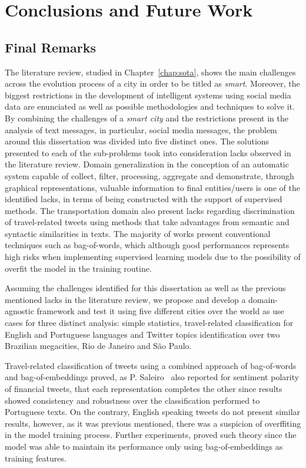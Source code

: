 \chapter{Conclusions and Future Work} \label{chap:conclusions}

\minitoc \mtcskip \noindent

\section{Final Remarks}
The literature review, studied in Chapter~\ref{chap:sota}, shows the main challenges across the evolution process of a city in order to be titled as \textit{smart}. Moreover, the biggest restrictions in the development of intelligent systems using social media data are enunciated as well as possible methodologies and techniques to solve it. By combining the challenges of a \textit{smart city} and the restrictions present in the analysis of text messages, in particular, social media messages, the problem around this dissertation was divided into five distinct ones. The solutions presented to each of the sub-problems took into consideration lacks observed in the literature review. Domain generalization in the conception of an automatic system capable of collect, filter, processing, aggregate and demonstrate, through graphical representations, valuable information to final entities/users is one of the identified lacks, in terms of being constructed with the support of supervised methods. The transportation domain also present lacks regarding discrimination of travel-related tweets using methods that take advantages from semantic and syntactic similarities in texts. The majority of works present conventional techniques such as bag-of-words, which although good performances represents high risks when implementing supervised learning models due to the possibility of overfit the model in the training routine.

Assuming the challenges identified for this dissertation as well as the previous mentioned lacks in the literature review, we propose and develop a domain-agnostic framework and test it using five different cities over the world as use cases for three distinct analysis: simple statistics, travel-related classification for English and Portuguese languages and Twitter topics identification over two Brazilian megacities, Rio de Janeiro and São Paulo.

Travel-related classification of tweets using a combined approach of bag-of-words and bag-of-embeddings proved, as P. Saleiro~\cite{saleiro2017texrep} also reported for sentiment polarity of financial tweets, that each representation completes the other since results showed consistency and robustness over the classification performed to Portuguese texts. On the contrary, English speaking tweets do not present similar results, however, as it was previous mentioned, there was a suspicion of overffiting in the model training process. Further experiments, proved such theory since the model was able to maintain its performance only using bag-of-embeddings as training features.

